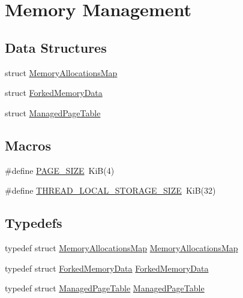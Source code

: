 \hypertarget{group__memory__hal}{}\section{Memory Management}
\label{group__memory__hal}
\subsection*{Data Structures}
\begin{DoxyCompactItemize}
\item 
struct \hyperlink{structMemoryAllocationsMap}{Memory\+Allocations\+Map}
\item 
struct \hyperlink{structForkedMemoryData}{Forked\+Memory\+Data}
\item 
struct \hyperlink{structManagedPageTable}{Managed\+Page\+Table}
\end{DoxyCompactItemize}
\subsection*{Macros}
\begin{DoxyCompactItemize}
\item 
\#define \hyperlink{group__memory__hal_ga7d467c1d283fdfa1f2081ba1e0d01b6e}{P\+A\+G\+E\+\_\+\+S\+I\+ZE}~KiB(4)
\item 
\#define \hyperlink{group__memory__hal_ga19026599ca53eb83da5f02be3604f4fc}{T\+H\+R\+E\+A\+D\+\_\+\+L\+O\+C\+A\+L\+\_\+\+S\+T\+O\+R\+A\+G\+E\+\_\+\+S\+I\+ZE}~KiB(32)
\end{DoxyCompactItemize}
\subsection*{Typedefs}
\begin{DoxyCompactItemize}
\item 
typedef struct \hyperlink{structMemoryAllocationsMap}{Memory\+Allocations\+Map} \hyperlink{group__memory__hal_ga91c66252a28d011008224fc4dc01885e}{Memory\+Allocations\+Map}
\item 
typedef struct \hyperlink{structForkedMemoryData}{Forked\+Memory\+Data} \hyperlink{group__memory__hal_gafcbcf8480ddd2494d17d17f196a27ca6}{Forked\+Memory\+Data}
\item 
typedef struct \hyperlink{structManagedPageTable}{Managed\+Page\+Table} \hyperlink{group__memory__hal_gad2397dbb839987d0753da093f7549f66}{Managed\+Page\+Table}
\end{DoxyCompactItemize}
